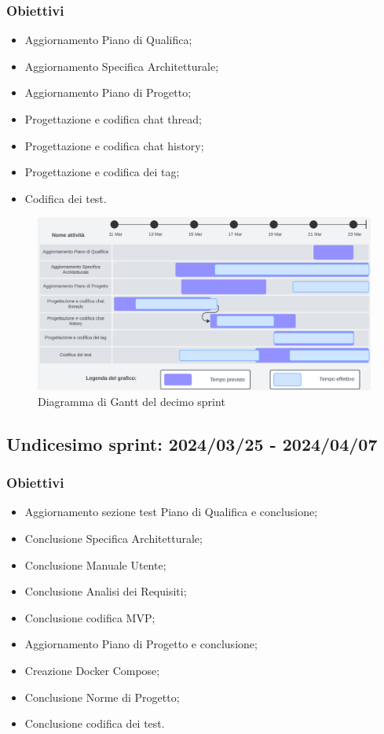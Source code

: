 \subsubsection{Obiettivi}
\begin{itemize}
    \item Aggiornamento Piano di Qualifica;
    \item Aggiornamento Specifica Architetturale;
    \item Aggiornamento Piano di Progetto;
    \item Progettazione e codifica chat thread;
    \item Progettazione e codifica chat history;
    \item Progettazione e codifica dei tag;
    \item Codifica dei test.
\end{itemize}

\begin{figure}[h!]
    \centering
    \includegraphics[width=\textwidth]{Roadmap10sprint.png} 
    \caption{Diagramma di Gantt del decimo sprint}
    \label{fig:roadmaps10s}
\end{figure}
\newpage

\subsection{Undicesimo sprint: 2024/03/25 - 2024/04/07}
\subsubsection{Obiettivi}
\begin{itemize}
    \item Aggiornamento sezione test Piano di Qualifica e conclusione;
    \item Conclusione Specifica Architetturale;
    \item Conclusione Manuale Utente;
    \item Conclusione Analisi dei Requisiti;
    \item Conclusione codifica MVP;
    \item Aggiornamento Piano di Progetto e conclusione;
    \item Creazione Docker Compose;
    \item Conclusione Norme di Progetto;
    \item Conclusione codifica dei test.
\end{itemize}


